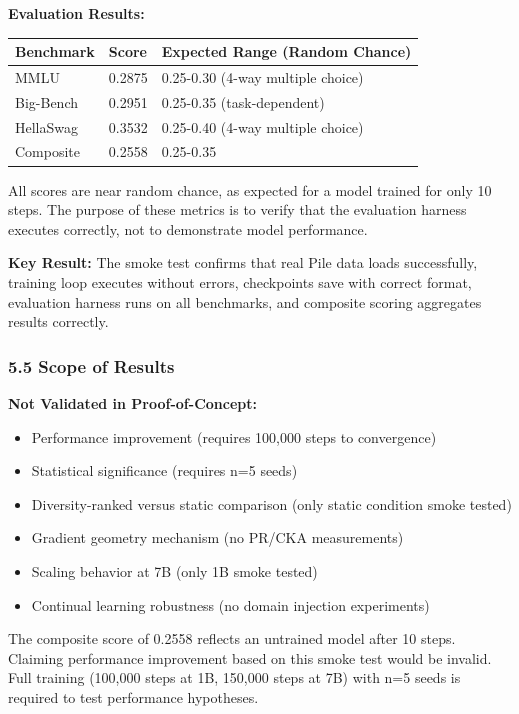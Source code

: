 \textbf{Evaluation Results:}

\begin{table}[htbp]
\centering
\begin{tabular}{lll}
\toprule
Benchmark & Score & Expected Range (Random Chance) \\
\midrule
MMLU & 0.2875 & 0.25-0.30 (4-way multiple choice) \\
Big-Bench & 0.2951 & 0.25-0.35 (task-dependent) \\
HellaSwag & 0.3532 & 0.25-0.40 (4-way multiple choice) \\
Composite & 0.2558 & 0.25-0.35 \\
\bottomrule
\end{tabular}
\end{table}

All scores are near random chance, as expected for a model trained for only 10 steps. The purpose of these metrics is to verify that the evaluation harness executes correctly, not to demonstrate model performance.

\textbf{Key Result:} The smoke test confirms that real Pile data loads successfully, training loop executes without errors, checkpoints save with correct format, evaluation harness runs on all benchmarks, and composite scoring aggregates results correctly.

\subsubsection{5.5 Scope of Results}

\textbf{Not Validated in Proof-of-Concept:}
\begin{itemize}
\item Performance improvement (requires 100,000 steps to convergence)
\item Statistical significance (requires n=5 seeds)
\item Diversity-ranked versus static comparison (only static condition smoke tested)
\item Gradient geometry mechanism (no PR/CKA measurements)
\item Scaling behavior at 7B (only 1B smoke tested)
\item Continual learning robustness (no domain injection experiments)
\end{itemize}

The composite score of 0.2558 reflects an untrained model after 10 steps. Claiming performance improvement based on this smoke test would be invalid. Full training (100,000 steps at 1B, 150,000 steps at 7B) with n=5 seeds is required to test performance hypotheses.

